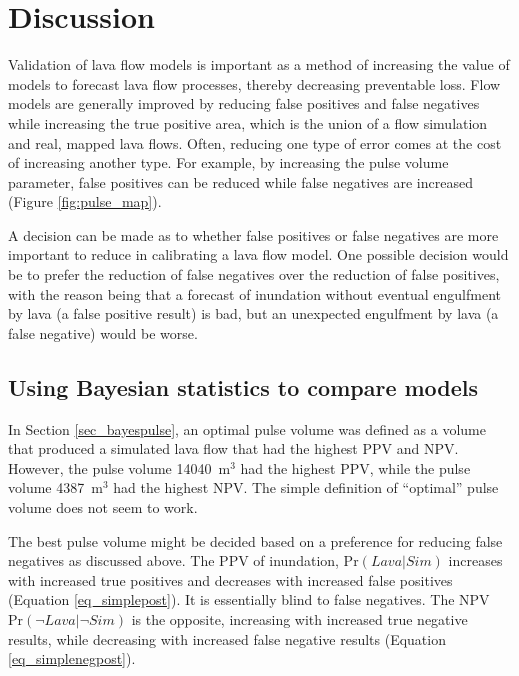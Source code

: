 
\section{Discussion}\label{sec:discussion}
		Validation of lava flow models is important as a method of increasing the value of models to forecast lava flow processes, thereby decreasing preventable loss. Flow models are generally improved by reducing false positives and false negatives while increasing the true positive area, which is the union of a flow simulation and real, mapped lava flows. Often, reducing one type of error comes at the cost of increasing another type. For example, by increasing the pulse volume parameter, false positives can be reduced while false negatives are increased (Figure \ref{fig:pulse_map}).
		
		A decision can be made as to whether false positives or false negatives are more important to reduce in calibrating a lava flow model. One possible decision would be to prefer the reduction of false negatives over the reduction of false positives, with the reason being that a forecast of inundation without eventual engulfment by lava (a false positive result) is bad, but an unexpected engulfment by lava (a false negative) would be worse.
		
		\subsection{Using Bayesian statistics to compare models}
		In Section \ref{sec_bayespulse}, an optimal pulse volume was defined as a volume that produced a simulated lava flow that had the highest PPV and NPV. However, the pulse volume 14040~m$^3$ had the highest PPV, while the pulse volume 4387~m$^3$ had the highest NPV. The simple definition of ``optimal'' pulse volume does not seem to work.
		
		The best pulse volume might be decided based on a preference for reducing false negatives as discussed above. The PPV of inundation, $\text{Pr}(Lava|Sim)$ increases with increased true positives and decreases with increased false positives (Equation \ref{eq_simplepost}). It is essentially blind to false negatives. The NPV $\text{Pr}(\neg Lava|\neg Sim)$ is the opposite, increasing with increased true negative results, while decreasing with increased false negative results (Equation \ref{eq_simplenegpost}). 
		
